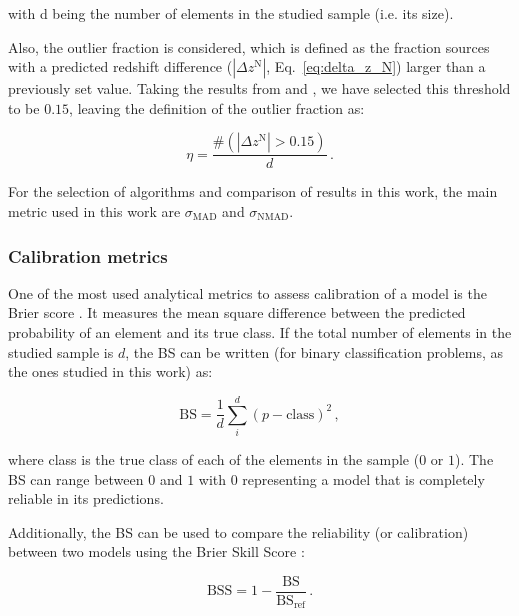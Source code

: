 \documentclass{aa}
\begin{document}
\noindent with d being the number of elements in the studied sample (i.e. its size).

Also, the outlier fraction \citep[$\eta$, as used in][]{2013ApJ...775...93D, 2022A&C....3800510L} is considered, which is defined as the fraction sources with a predicted redshift difference ($\left|\Delta z^{\mathrm{N}}\right|$, Eq.~\ref{eq:delta_z_N}) larger than a previously set value. Taking the results from \citet{2009ApJ...690.1236I} and \citet{2010A&A...523A..31H}, we have selected this threshold to be $0.15$, leaving the definition of the outlier fraction as:

\begin{equation}\label{eq:outlier_fraction}
\eta = \frac{\# \left( \left|\Delta z^{\mathrm{N}}\right| > 0.15 \right)}{d}\,.
\end{equation}

For the selection of algorithms and comparison of results in this work, the main metric used in this work are $\sigma_{\mathrm{MAD}}$ and $\sigma_{\mathrm{NMAD}}$.

\subsubsection{Calibration metrics}\label{sec:metrics_calibration}

One of the most used analytical metrics to assess calibration of a model is the Brier score \citep[BS;][]{Brier_1950}. It measures the mean square difference between the predicted probability of an element and its true class. If the total number of elements in the studied sample is $d$, the BS can be written (for binary classification problems, as the ones studied in this work) as:

\begin{equation}\label{eq:brier_score}
\mathrm{BS} = \frac{1}{d} \sum_{i}^{d}(p - \mathrm{class})^{2}\,,
\end{equation}

\noindent where  class is the true class of each of the elements in the sample ($0$ or $1$).
The BS can range between $0$ and $1$ with $0$ representing a model that is completely reliable in its predictions.

Additionally, the BS can be used to compare the reliability (or calibration) between two models using the Brier Skill Score \citep[BSS; e.g.][]{Glahn_1970}:

\begin{equation}\label{eq:brier_skill_score}
\mathrm{BSS} = 1 - \frac{\mathrm{BS}}{\mathrm{BS}_{\mathrm{ref}}}\,.
\end{equation}
\end{document}
